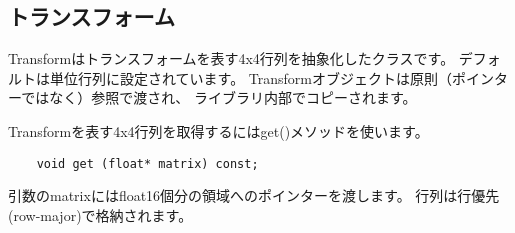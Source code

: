 
\subsection{トランスフォーム}

Transformはトランスフォームを表す4x4行列を抽象化したクラスです。
デフォルトは単位行列に設定されています。
Transformオブジェクトは原則（ポインターではなく）参照で渡され、
ライブラリ内部でコピーされます。

Transformを表す4x4行列を取得するにはget()メソッドを使います。

\begin{verbatim}
    void get (float* matrix) const;
\end{verbatim}

引数のmatrixにはfloat16個分の領域へのポインターを渡します。
行列は行優先(row-major)で格納されます。

